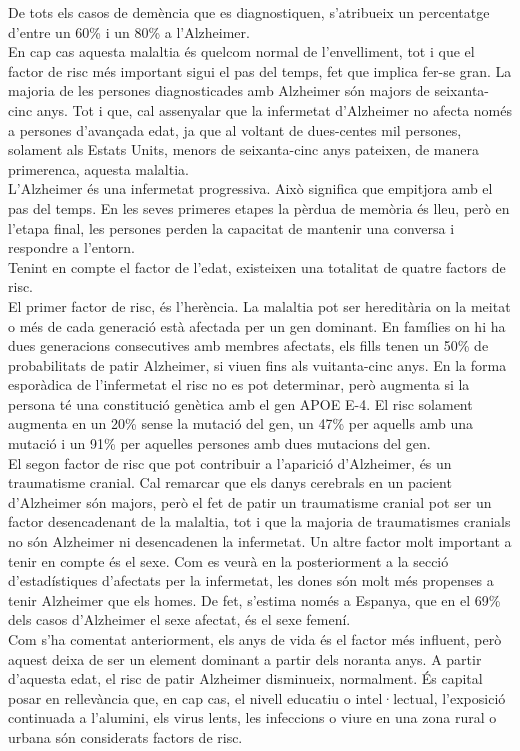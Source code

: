 \documentclass[a4paper,12pt]{article}
\begin{document}
De tots els casos de demència que es diagnostiquen, s'atribueix un percentatge d'entre un 60\% i un 80\% a l'Alzheimer.\\
En cap cas aquesta malaltia és quelcom normal de l'envelliment, tot i que el factor de risc més important sigui el pas del temps, fet que implica fer-se gran. La majoria de les persones diagnosticades amb Alzheimer són majors de seixanta-cinc anys. Tot i que, cal assenyalar que la infermetat d'Alzheimer no afecta només a persones d'avançada edat, ja que al voltant de dues-centes mil persones, solament als Estats Units, menors de seixanta-cinc anys pateixen, de manera primerenca, aquesta malaltia.\\
L'Alzheimer és una infermetat progressiva. Això significa que empitjora amb el pas del temps. En les seves primeres etapes la pèrdua de memòria és lleu, però en l'etapa final, les persones perden la capacitat de mantenir una conversa i respondre a l'entorn.\\
Tenint en compte el factor de l'edat, existeixen una totalitat de quatre factors de risc.\\
El primer factor de risc, és l'herència. La malaltia pot ser hereditària on la meitat o més de cada generació està afectada per un gen dominant. En famílies on hi ha dues generacions consecutives amb membres afectats, els fills tenen un 50\% de probabilitats de patir Alzheimer, si viuen fins als vuitanta-cinc anys. En la forma esporàdica de l'infermetat el risc no es pot determinar, però augmenta si la persona té una constitució genètica amb el gen APOE E-4. El risc solament augmenta en un 20\% sense la mutació del gen, un 47\% per aquells amb una mutació i un 91\% per aquelles persones amb dues mutacions del gen.\\
El segon factor de risc que pot contribuir a l'aparició d'Alzheimer, és un traumatisme cranial. Cal remarcar que els danys cerebrals en un pacient d'Alzheimer són majors, però el fet de patir un traumatisme cranial pot ser un factor desencadenant de la malaltia, tot i que la majoria de traumatismes cranials no són Alzheimer ni desencadenen la infermetat.
Un altre factor molt important a tenir en compte és el sexe. Com es veurà en la posteriorment a la secció d'estadístiques d'afectats per la infermetat, les dones són molt més propenses a tenir Alzheimer que els homes. De fet, s'estima només a Espanya, que en el 69\% dels casos d'Alzheimer el sexe afectat, és el sexe femení.\\
Com s'ha comentat anteriorment, els anys de vida és el factor més influent, però aquest deixa de ser un element dominant a partir dels noranta anys. A partir d'aquesta edat, el risc de patir Alzheimer disminueix, normalment. És capital posar en rellevància que, en cap cas, el nivell educatiu o intel·lectual, l'exposició continuada a l'alumini, els virus lents, les infeccions o viure en una zona rural o urbana són considerats factors de risc.
\end{document}
